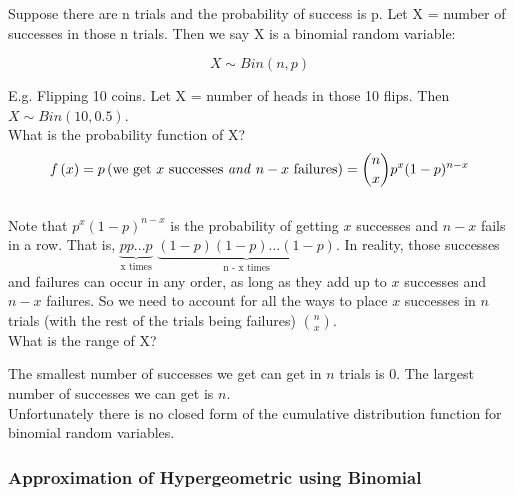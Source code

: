 \documentclass[12pt, letterpaper]{article}
\begin{document}
Suppose there are n trials and the probability of success is p. Let X = number of successes in those n trials. Then we say X is a binomial random variable:

\begin{equation}
X \sim Bin(n, p)
\end{equation}

E.g. Flipping 10 coins. Let X = number of heads in those 10 flips. Then \(X \sim Bin(10, 0.5)\).\\

What is the probability function of X?
\begin{equation}
f\left(x\right) = p\left(\text{we get $x$ successes \emph{and} $n - x$ failures}\right) = {{n} \choose {x}} p^x (1 - p)^{n - x}
\end{equation}\\

Note that \(p^x (1 - p)^{n-x}\) is the probability of getting \(x\) successes and \(n - x\) fails in a row. That is, \(\underbrace{p p ... p}_\text{x times}\) \(\underbrace{(1 - p) (1 - p) ... (1 - p)}_\text{n - x times}\). In reality, those successes and failures can occur in any order, as long as they add up to \(x\) successes and \(n - x\) failures. So we need to account for all the ways to place \(x\) successes in \(n\) trials (with the rest of the trials being failures) \({{n} \choose {x}}\).\\

What is the range of X?

The smallest number of successes we get can get in \(n\) trials is 0. The largest number of successes we can get is \(n\).\\

Unfortunately there is no closed form of the cumulative distribution function for binomial random variables.

\subsubsection{Approximation of Hypergeometric using Binomial}
\end{document}
